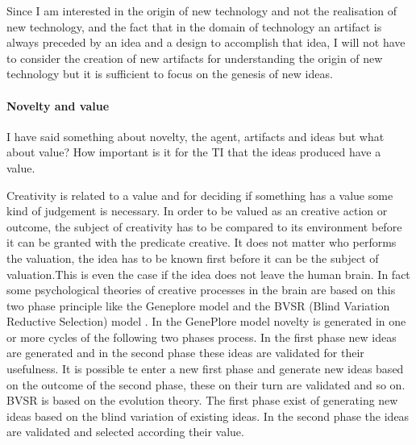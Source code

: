 
Since I am interested in the origin of new technology and not the realisation of new technology, and the fact that in the domain of technology an artifact is always preceded by an idea and a design to accomplish that idea, I will not have to consider the creation of new artifacts for understanding the origin of new technology but it is sufficient to focus on the genesis of new ideas.




\paragraph{Novelty and value}
I have said something about novelty, the agent, artifacts and ideas but what about value? How important is it for the TI that the ideas produced have a value. 

Creativity is related to a value and for deciding if something has a value some kind of judgement is necessary. In order to be valued as an creative action or outcome, the subject of creativity has to be compared to its environment before it can be granted with the predicate creative. It does not matter who performs the valuation, the idea has to be known first before it can be the subject of valuation.This is even the case if the idea does not leave the human brain.
In fact some psychological theories of creative processes in the brain are based on this two phase principle like the Geneplore model \cite{finke1996imagery} and the BVSR (Blind Variation Reductive Selection) model \cite{simonton2003human}.
In the GenePlore model novelty is generated in one or more cycles of the following two phases process. In the first phase new ideas are generated and in the second phase these ideas are validated for their usefulness. It is possible te enter a new first phase and generate new ideas based on the outcome of the second phase, these on their turn are validated and so on. 
BVSR is based on the evolution theory. The first phase exist of generating new ideas based on the blind variation of existing ideas. In the second phase the ideas are validated and selected according their value.

